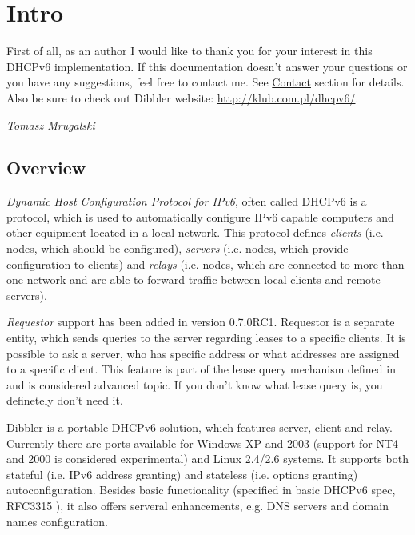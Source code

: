 
\section{Intro}
First of all, as an author I would like to thank you for your interest
in this DHCPv6 implementation. If this documentation doesn't answer
your questions or you have any suggestions, feel free to contact
me. See \hyperlink{contact}{Contact} section for details. Also be sure
to check out Dibbler website: \url{http://klub.com.pl/dhcpv6/}.

\begin{flushright}
\emph{Tomasz Mrugalski}
\end{flushright}

\subsection{Overview}

\emph{Dynamic Host Configuration Protocol for IPv6}, often called
DHCPv6 is a protocol, which is used to automatically configure IPv6
capable computers and other equipment located in a local network. This
protocol defines \emph{clients} (i.e. nodes, which should be configured),
\emph{servers} (i.e. nodes, which provide configuration to clients) and
\emph{relays} (i.e. nodes, which are connected to more than one network and
are able to forward traffic between local clients and remote servers).


\emph{Requestor} support has been added in version 0.7.0RC1. Requestor
is a separate entity, which sends queries to the server regarding
leases to a specific clients. It is possible to ask a server, who has
specific address or what addresses are assigned to a specific client. 
This feature is part of the lease query mechanism defined in
\cite{rfc5007} and is considered advanced topic. If you don't know
what lease query is, you definetely don't need it.

Dibbler is a portable DHCPv6 solution, which features server, client and
relay. Currently there are ports available for Windows XP and 2003 (support for
NT4 and 2000 is considered experimental) and Linux 2.4/2.6 systems. 
It supports both stateful (i.e. IPv6 address granting) and stateless
(i.e. options granting) autoconfiguration. Besides basic
functionality (specified in basic DHCPv6 spec, RFC3315 \cite{rfc3315}),
it also offers serveral enhancements, e.g. DNS servers and domain names
configuration.

